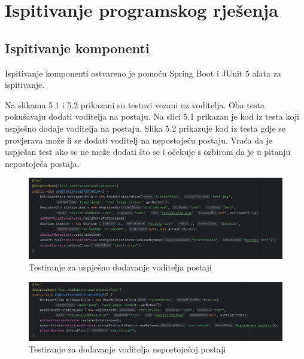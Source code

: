 		
	
	
	
		\section{Ispitivanje programskog rješenja}
			
			\subsection{Ispitivanje komponenti}
			
			Ispitivanje komponenti ostvareno je pomoću Spring Boot i JUnit 5 alata za ispitivanje.
			
			Na slikama 5.1 i 5.2 prikazani su testovi vezani uz voditelja. Oba testa pokušavaju dodati voditelja na postaju. Na slici 5.1 prikazan je kod iz testa koji uspješno dodaje voditelja na postaju. Slika 5.2 prikazuje kod iz testa gdje se provjerava može li se dodati voditelj na nepostojeću postaju. Vraća da je uspješan test ako se ne može dodati što se i očekuje s ozbirom da je u pitanju nepostojeća postaja.  
			
			\begin{figure}[H]
				\centering
				\includegraphics[width=\textwidth]{slike/voditelj1.JPEG}
				\caption{Testiranje za uspješno dodavanje voditelja postaji}
				\label{fig:dijagram_baze}
			\end{figure}
			
			\begin{figure}[H]
				\centering
				\includegraphics[width=\textwidth]{slike/voditelj2.JPEG}
				\caption{Testiranje za dodavanje voditelja nepostojećoj postaji}
				\label{fig:dijagram_baze}
			\end{figure}
			
